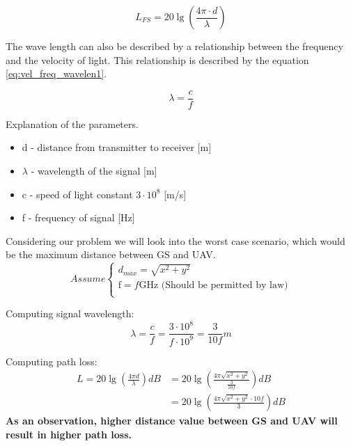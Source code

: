 \begin{equation}\label{eq:path_losses}
	L_{FS} = 20\lg\left (\frac{4\pi \cdot d}{\lambda} \right)
\end{equation}

The wave length can also be described by a relationship between the frequency and the velocity of light. This relationship is described by the equation \ref{eq:vel_freq_wavelen1}.

\begin{equation}\label{eq:vel_freq_wavelen1}
	\lambda = \frac{c}{f}
\end{equation}

Explanation of the parameters.
\begin{itemize}
	\item d - distance from transmitter to receiver [m]
	\item $\lambda$ - wavelength of the signal [m]
	\item c - speed of light constant $3\cdot 10^8$ [m/s] 
	\item f - frequency of signal [Hz]
\end{itemize}

Considering our problem we will look into the worst case scenario, which would be the maximum distance between GS and UAV. 
\begin{equation*}
	Assume 
	\begin{cases}
	d_{max} = \sqrt{x^2+y^2}\\
	\text{f} = f\text{GHz (Should be permitted by law})\\
	\end{cases}
\end{equation*}

Computing signal wavelength:
\begin{equation}\label{eq:vel_freq_wavelen2}
	\lambda = \frac{c}{f} 
	        = \frac{3\cdot 10^{8}}{f\cdot 10^{9}}
	        = \frac{3}{10f}m
\end{equation}

Computing path loss:
\begin{align*}\label{eq:path_loses_calc}
	L = 20\lg\left (\frac{4\pi d}{\lambda} \right) dB 
	 &= 20\lg\left (\frac{4\pi \sqrt{x^2+y^2}}{\frac{3}{10f}} \right) dB\\ 
	 &= 20\lg\left (\frac{4\pi \sqrt{x^2+y^2}\cdot 10f}{ 3} \right) dB
\end{align*}
\noindent \textbf{As an observation, higher distance value between GS and UAV will result in higher path loss.}

